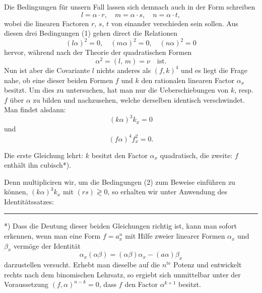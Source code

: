 \documentclass[11pt]{article}
\providecommand{\weberpage}[1]{}
\providecommand{\weq}[2]{\begin{equation}\tag{#1}#2\end{equation}}
\begin{document}
Die Bedingungen für unsern Fall lassen sich demnach auch in der Form schreiben
\weq{1}{l=\alpha\cdot r,\quad m=\alpha\cdot s,\quad n=\alpha\cdot t,}
wobei die linearen Factoren $r$, $s$, $t$ von einander verschieden sein sollen. Aus diesen drei Bedingungen (1) gehen direct die Relationen
\weq{2}{(l\alpha)^2=0,\quad (m\alpha)^2=0,\quad (n\alpha)^2=0}
hervor, während nach der Theorie der quadratischen Formen
\[
\alpha^2=(l,\,m)=\nu\quad\text{ist.}
\]
Nun ist aber die Covariante $l$ nichts anderes als $(f,k)^4$ und es liegt die Frage nahe, ob eine dieser beiden Formen $f$ und $k$ den rationalen linearen Factor $\alpha_x$ besitzt. Um dies zu untersuchen, hat man nur die Ueberschiebungen von $k$, resp. $f$ über $\alpha$ zu bilden und nachzusehen, welche derselben identisch verschwindet. Man findet alsdann:
\weq{3}{(k\alpha)^3k_x=0}
und
\weq{4}{(f\alpha)^4f_x^2=0.}

Die erste Gleichung lehrt: $k$ besitzt den Factor $\alpha_x$ quadratisch, die zweite: $f$ enthält ihn cubisch*).

Denn multipliciren wir, um die Bedingungen (2) zum Beweise einführen zu können, $(k\alpha)^3k_x$ mit $(rs)\gtrless 0$, so erhalten wir unter Anwendung des Identitätssatzes:

\noindent\rule{4cm}{0.4pt}

*) Dass die Deutung dieser beiden Gleichungen richtig ist, kann man sofort erkennen, wenn man eine Form $f=a_x^n$ mit Hilfe zweier linearer Formen $\alpha_x$ und $\beta_x$ vermöge der Identität
\[
\alpha_x(\alpha\beta)=(\alpha\beta)\alpha_x-(a\alpha)\beta_x
\]
darzustellen versucht. Erhebt man dieselbe auf die $n^{\text{te}}$ Potenz und entwickelt rechts nach dem binomischen Lehrsatz, so ergiebt sich unmittelbar unter der Voraussetzung $(f,\alpha)^{n-k}=0$, dass $f$ den Factor $\alpha^{k+1}$ besitzt.


\weberpage{309}
\end{document}
